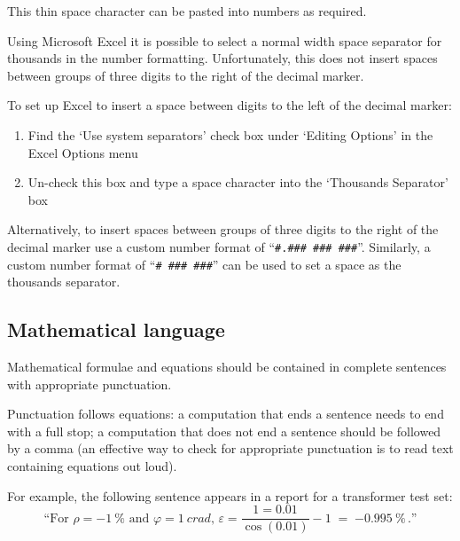 This thin space character can be pasted into numbers as required.

Using Microsoft Excel it is possible to select a normal width space separator for thousands in the number formatting. Unfortunately, this does not insert spaces between groups of three digits to the right of the decimal marker. 

To set up Excel to insert a space between digits to the left of the decimal marker:
\begin{enumerate}
\item Find the `Use system separators' check box under `Editing Options' in the Excel Options menu 
\item Un-check this box and type a space character into the `Thousands Separator' box
\end{enumerate} 

Alternatively, to insert spaces between groups of three digits to the right of the decimal marker use a custom number format of ``\verb|#.### ### ###|''. Similarly, a custom number format of ``\verb|# ### ###|'' can be used to set a space as the thousands separator.

\subsection{Mathematical language}
Mathematical formulae and equations should be contained in complete sentences with appropriate punctuation. 

Punctuation follows equations: a computation that ends a sentence needs to end with a full stop; a computation that does not end a sentence should be followed by a comma (an effective way to check for appropriate punctuation is to read text containing equations out loud). 

For example, the following sentence appears in a report for a transformer test set: 
\[
\text{``For $\rho = \SI{-1}{\%}$ and $\varphi= \SI{1}{crad}$, }
\varepsilon = \frac{1=0.01}{\cos(0.01)} - 1 \; =\; \SI{-0.995}{\%}\,. 
\text{''}
\]

